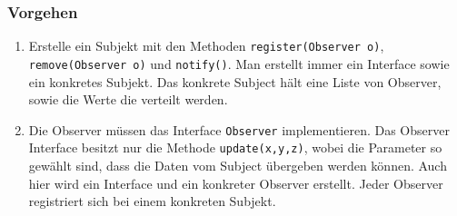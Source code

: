 \subsubsection{Vorgehen}
\begin{enumerate}
	\item Erstelle ein Subjekt mit den Methoden \lstinline|register(Observer o)|, \lstinline|remove(Observer o)| und \lstinline|notify()|. Man erstellt immer ein Interface sowie ein konkretes Subjekt. Das konkrete Subject hält eine Liste von Observer, sowie die Werte die verteilt werden.
	\item Die Observer müssen das Interface \lstinline|Observer| implementieren. Das Observer Interface besitzt nur die Methode \lstinline|update(x,y,z)|, wobei die Parameter so gewählt sind, dass die Daten vom Subject übergeben werden können. Auch hier wird ein Interface und ein konkreter Observer erstellt. Jeder Observer registriert sich bei einem konkreten Subjekt.
\end{enumerate}

\clearpage

